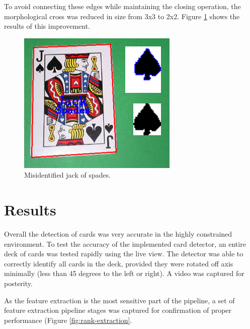 \documentclass[conference]{IEEEtran}
\begin{document}
To avoid connecting these edges while maintaining the closing operation, the morphological cross was
reduced in size from 3x3 to 2x2. Figure \ref{fig:good-jack} shows the results of this improvement.

\begin{figure}[htbp]
\centerline{\includegraphics[width=\columnwidth]{good-jack.png}}
\caption{Misidentified jack of spades.}
\label{fig:good-jack}
\end{figure}

\section{Results}
Overall the detection of cards was very accurate in the highly constrained environment. To test the
accuracy of the implemented card detector, an entire deck of cards was tested rapidly using the live
view. The detector was able to correctly identify all cards in the deck, provided they were rotated
off axis minimally (less than 45 degrees to the left or right). A video was captured for posterity.

As the feature extraction is the most sensitive part of the pipeline, a set of feature extraction
pipeline stages was captured for confirmation of proper performance (Figure
\ref{fig:rank-extraction}.
\end{document}
